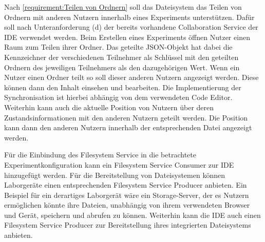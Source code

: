 Nach \autoref{requirement:Teilen von Ordnern} soll das Dateisystem das Teilen von Ordnern mit anderen Nutzern innerhalb eines Experiments unterstützen. Dafür soll nach Unteranforderung (d) der bereits vorhandene Collaboration Service der IDE verwendet werden. Beim Erstellen eines Experiments öffnen Nutzer einen Raum zum Teilen ihrer Ordner. Das geteilte JSON-Objekt hat dabei die Kennzeichner der verschiedenen Teilnehmer als Schlüssel mit den geteilten Ordnern des jeweiligen Teilnehmers als den dazugehörigen Wert. Wenn ein Nutzer einen Ordner teilt so soll dieser anderen Nutzern angezeigt werden. Diese können dann den Inhalt einsehen und bearbeiten. Die Implementierung der Synchronisation ist hierbei abhängig von dem verwendeten Code Editor. Weiterhin kann auch die aktuelle Position von Nutzern über deren Zustandsinformationen mit den anderen Nutzern geteilt werden. Die Position kann dann den anderen Nutzern innerhalb der entsprechenden Datei angezeigt werden.

Für die Einbindung des Filesystem Service in die betrachtete Experimentkonfiguration kann ein Filesystem Service Consumer zur IDE hinzugefügt werden. Für die Bereitstellung von Dateisystemen können Laborgeräte einen entsprechenden Filesystem Service Producer anbieten. Ein Beispiel für ein derartiges Laborgerät wäre ein Storage-Server, der es Nutzern ermöglichen könnte ihre Dateien, unabhängig von ihrem verwendeten Browser und Gerät, speichern und abrufen zu können. Weiterhin kann die IDE auch einen Filesystem Service Producer zur Bereitstellung ihres integrierten Dateisystems anbieten.